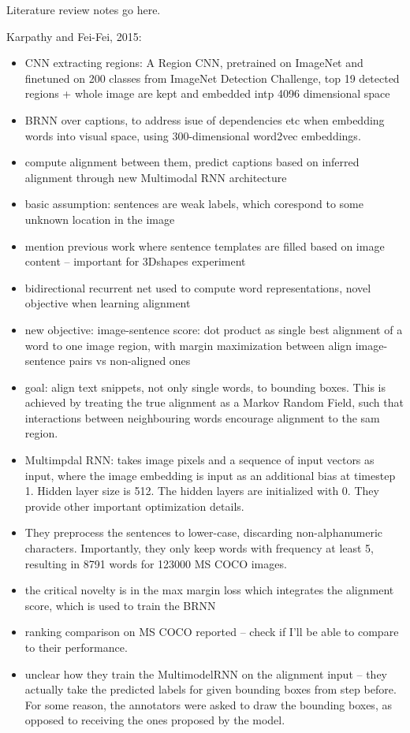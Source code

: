 Literature review notes go here.

Karpathy and Fei-Fei, 2015:
\begin{itemize}
	\item CNN extracting regions: A Region CNN, pretrained on ImageNet and finetuned on 200 classes from ImageNet Detection Challenge, top 19 detected regions + whole image are kept and embedded intp 4096 dimensional space
	\item BRNN over captions, to address isue of dependencies etc when embedding words into visual space, using 300-dimensional word2vec embeddings. 
	\item compute alignment between them, predict captions based on inferred alignment through new Multimodal RNN architecture
	\item basic assumption: sentences are weak labels, which corespond to some unknown location in the image
	\item mention previous work where sentence templates are filled based on image content -- important for 3Dshapes experiment
	\item bidirectional recurrent net used to compute word representations, novel objective when learning alignment
	\item new objective: image-sentence score: dot product as single best alignment of a word to one image region, with margin maximization between align image-sentence pairs vs non-aligned ones
	\item goal: align text snippets, not only single words, to bounding boxes. This is achieved by treating the true alignment as a Markov Random Field, such that interactions between neighbouring words encourage alignment to the sam region.
	\item Multimpdal RNN: takes image pixels and a sequence of input vectors as input, where the image embedding is input as an additional bias at timestep 1. Hidden layer size is 512. The hidden layers are initialized with 0. They provide other important optimization details.
	\item They preprocess the sentences to lower-case, discarding non-alphanumeric characters. Importantly, they only keep words with frequency at least 5, resulting in 8791 words for 123000 MS COCO images. 
	\item the critical novelty is in the max margin loss which integrates the alignment score, which is used to train the BRNN
	\item ranking comparison on MS COCO reported -- check if I'll be able to compare to their performance.
	\item unclear how they train the MultimodelRNN on the alignment input -- they actually take the predicted labels for given bounding boxes from step before. For some reason, the annotators were asked to draw the bounding boxes, as opposed to receiving the ones proposed by the model.
\end{itemize}